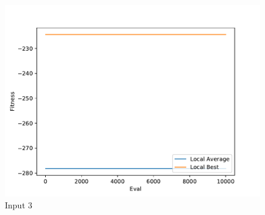 \documentclass{standalone}
\begin{document}
\begin{figure}[!htb]
	\caption{Input 3}
	\label{fig:graph_3012}
	\includegraphics[width=\textwidth]{../graphs/graphs/3012.pdf}
\end{figure}
\end{document}
